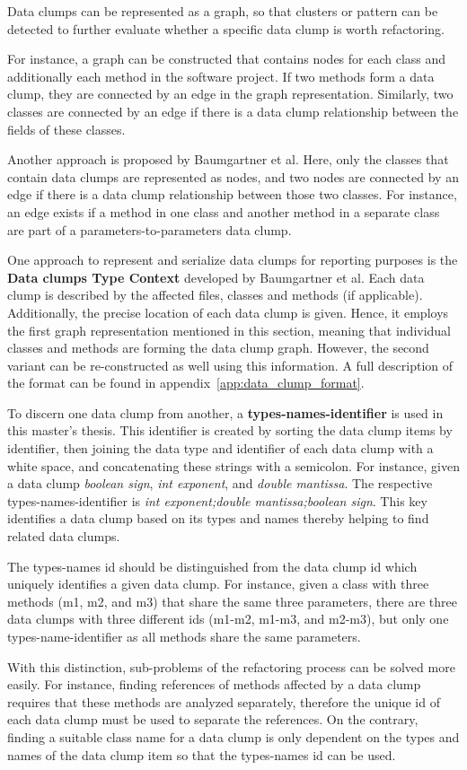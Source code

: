 Data clumps can be represented as a graph, so that clusters or pattern can be detected to further evaluate whether a specific data clump is worth refactoring. 

For instance, a graph can be constructed that contains nodes for each class and additionally each method in the software project. If two methods form a data clump, they are connected by an edge in the graph representation. Similarly, two classes  are connected by an edge if there is a data clump relationship between the fields of these classes. 

Another approach is proposed by Baumgartner et al. Here, only the classes that contain data clumps are represented as nodes, and two nodes are connected by an edge if there is a data clump relationship between those two classes. For instance, an edge exists if a method in one class and another method in a separate class are part of a parameters-to-parameters data clump.~\cite{data_clumps_baumgartner}


One approach to represent and serialize data clumps for reporting purposes is the \textbf{Data clumps Type Context} \cite{dataclump_type_context} developed by Baumgartner et al. Each data clump is described by the affected files, classes and methods (if applicable). Additionally, the precise location of each data clump is given. Hence,  it employs the first graph representation mentioned in this section, meaning that individual classes and methods are forming the data clump graph. However, the second variant can be re-constructed as well using this information. 
A full description of the format can be found in appendix~\ref{app:data_clump_format}.

To discern one data clump from another, a \textbf{types-names-identifier} is used in this master's thesis. This identifier is created by sorting the data clump items by identifier, then joining the data type and identifier of each data clump with a white space, and concatenating these strings with a semicolon. For instance, given a data clump \textit{boolean sign}, \textit{int exponent}, and \textit{double mantissa}. The respective types-names-identifier is \textit{int exponent;double mantissa;boolean sign}. This key identifies a data clump based on its types and names thereby helping to find related data clumps. 

The types-names id should be distinguished from the data clump id which uniquely identifies a given data clump. For instance, given a class with three methods (m1, m2, and m3) that share the same three parameters, there are three data clumps with three different ids (m1-m2, m1-m3, and m2-m3), but only one types-name-identifier as all methods share the same parameters. 

With this distinction, sub-problems of the refactoring process can be solved more easily. For instance, finding references of methods affected by a data clump requires that these methods are analyzed separately, therefore the unique id of each data clump must be used to separate the references. On the contrary, finding a suitable class name for a data clump is only dependent on the types and names of the data clump item so that the types-names id can be used. 





